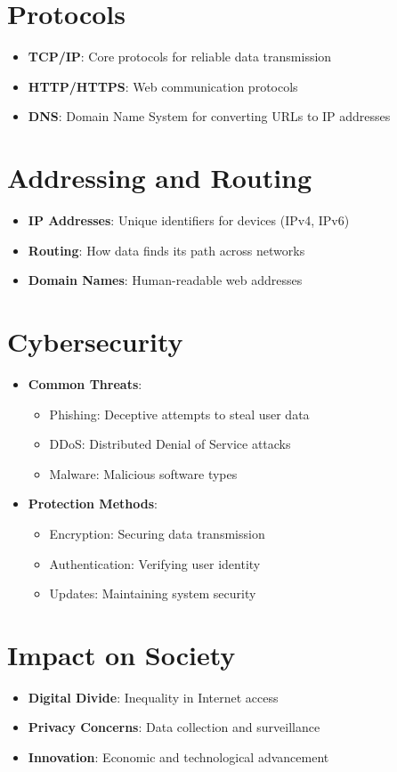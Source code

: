 \section{Protocols}
\begin{itemize}
    \item \textbf{TCP/IP}: Core protocols for reliable data transmission
    \item \textbf{HTTP/HTTPS}: Web communication protocols
    \item \textbf{DNS}: Domain Name System for converting URLs to IP addresses
\end{itemize}

\section{Addressing and Routing}
\begin{itemize}
    \item \textbf{IP Addresses}: Unique identifiers for devices (IPv4, IPv6)
    \item \textbf{Routing}: How data finds its path across networks
    \item \textbf{Domain Names}: Human-readable web addresses
\end{itemize}

\section{Cybersecurity}
\begin{itemize}
    \item \textbf{Common Threats}:
        \begin{itemize}
            \item Phishing: Deceptive attempts to steal user data
            \item DDoS: Distributed Denial of Service attacks
            \item Malware: Malicious software types
        \end{itemize}
    \item \textbf{Protection Methods}:
        \begin{itemize}
            \item Encryption: Securing data transmission
            \item Authentication: Verifying user identity
            \item Updates: Maintaining system security
        \end{itemize}
\end{itemize}

\section{Impact on Society}
\begin{itemize}
    \item \textbf{Digital Divide}: Inequality in Internet access
    \item \textbf{Privacy Concerns}: Data collection and surveillance
    \item \textbf{Innovation}: Economic and technological advancement
\end{itemize}